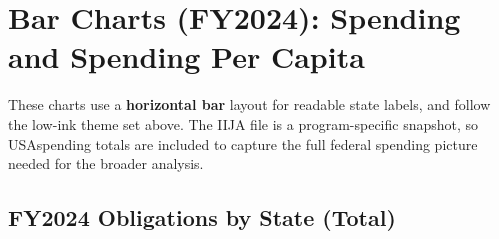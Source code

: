 \documentclass[
  11pt,
]{article}
\begin{document}
\section{Bar Charts (FY2024): Spending and Spending Per
Capita}\label{bar-charts-fy2024-spending-and-spending-per-capita}

These charts use a \textbf{horizontal bar} layout for readable state
labels, and follow the low-ink theme set above. The IIJA file is a
program-specific snapshot, so USAspending totals are included to capture
the full federal spending picture needed for the broader analysis.

\subsection{FY2024 Obligations by State
(Total)}\label{fy2024-obligations-by-state-total}
\end{document}
